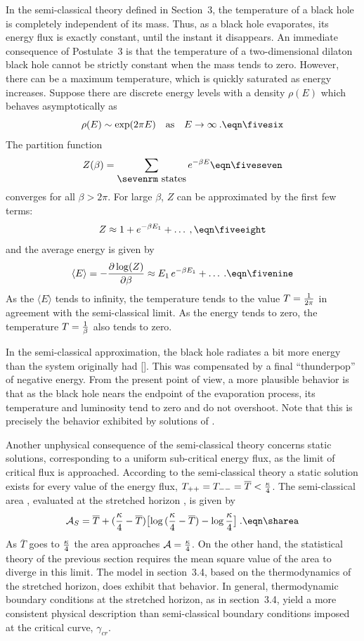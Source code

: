 In the semi-classical theory defined in Section~3, the temperature of
a black hole is completely independent of its mass.  Thus, as a black
hole evaporates, its energy flux is exactly constant, until the
instant it disappears.  An immediate consequence of Postulate~3 is
that the temperature of a two-dimensional dilaton black hole cannot
be strictly constant when the mass tends to zero.  However, there can
be a maximum temperature, which is quickly saturated as energy
increases.  Suppose there are discrete energy levels with a density
$\rho(E)$ which behaves asymptotically as
$$
\rho(E) \sim \exp(2\pi E) \quad
\hbox{as} \quad E \rightarrow \infty \>.
\eqn\fivesix
$$
The partition function
$$
Z(\beta) = \sum_{\hbox{\sevenrm states}} e^{-\beta E}
\eqn\fiveseven
$$
converges for all $\beta > 2\pi$.  For large $\beta$, $Z$ can be
approximated by the first few terms:
$$
Z \approx 1 + e^{-\beta E_1} + \ldots \>,
\eqn\fiveeight
$$
and the average energy is given by
$$
\langle E \rangle = - {\pa \log (Z) \over \pa \beta}
\approx E_1\, e^{-\beta E_1} + \ldots \>.
\eqn\fivenine
$$
As the $\langle E \rangle$ tends to infinity, the temperature tends
to the value $T = {1\over 2\pi}$ in agreement with the semi-classical
limit.  As the energy tends to zero, the temperature $T ={1\over
\beta}$ also tends to zero.

In the semi-classical approximation, the black hole radiates a bit
more energy than the system originally had [\RSTtwo].  This was
compensated by a final ``thunderpop'' of negative energy.  From the
present point of view, a more plausible behavior is that as the black
hole nears the endpoint of the evaporation process, its temperature
and luminosity tend to zero and do not overshoot.  Note that this is
precisely the behavior exhibited by solutions of \threefourtythree .

Another unphysical consequence of the semi-classical theory concerns
static solutions, corresponding to a uniform sub-critical energy
flux, as the limit of critical flux is approached.  According to the
semi-classical theory a static solution exists for every value of the
energy flux, $T_{++}=T_{--}={\overline T}<{\kappa\over 4}$.  The
semi-classical area \areatwo , evaluated at the stretched horizon
\hstwo , is given by
$$
{\cal A}_S = {\overline T}
+({\kappa\over 4}-{\overline T})\bigl[
\log{({\kappa\over 4}-{\overline T})}
-\log{\kappa\over 4}\bigr] \>.
\eqn\sharea
$$
As ${\overline T}$ goes to ${\kappa\over 4}$ the area approaches
${\cal A}={\kappa\over 4}$.  On the other hand, the statistical
theory of the previous section requires the mean square value of the
area to diverge in this limit.  The model in section~3.4, based on
the thermodynamics of the stretched horizon, does exhibit that
behavior.  In general, thermodynamic boundary conditions at the
stretched horizon, as in section~3.4, yield a more consistent
physical description than semi-classical boundary conditions imposed
at the critical curve, $\gamma_{cr}$.


